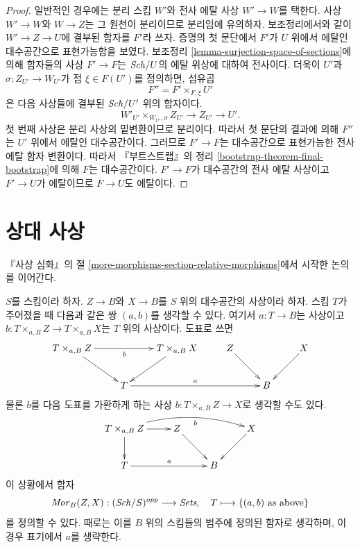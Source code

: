 \begin{proof}
\medskip\noindent
일반적인 경우에는 분리 스킴 $W'$와 전사 에탈 사상
$W' \to W$를 택한다. 사상 $W' \to W$와 $W \to Z$는 그 원천이
분리이므로 분리임에 유의하자. 보조정리에서와 같이
$W' \to Z \to U$에 결부된 함자를 $F'$라 쓰자. 증명의 첫 문단에서
$F'$가 $U$ 위에서 에탈인 대수공간으로 표현가능함을 보였다.
보조정리 \ref{lemma-surjection-space-of-sections}에 의해 함자들의 사상
$F' \to F$는 $\mathit{Sch}/U$의 에탈 위상에 대하여 전사이다.
더욱이 $U'$과 $\sigma : Z_{U'} \to W_{U'}$가 점
$\xi \in F(U')$를 정의하면, 섬유곱
$$
F'' = F' \times_{F, \xi} U'
$$
은 다음 사상들에 결부된 $\mathit{Sch}/U'$ 위의 함자이다.
$$
W'_{U'} \times_{W_{U'}, \sigma} Z_{U'} \to Z_{U'} \to U'.
$$
첫 번째 사상은 분리 사상의 밑변환이므로 분리이다. 따라서 첫 문단의
결과에 의해 $F''$는 $U'$ 위에서 에탈인 대수공간이다.
그러므로 $F' \to F$는 대수공간으로 표현가능한 전사 에탈 함자 변환이다.
따라서 『부트스트랩』의 정리
\ref{bootstrap-theorem-final-bootstrap}에 의해 $F$는 대수공간이다.
$F' \to F$가 대수공간의 전사 에탈 사상이고 $F' \to U$가
에탈이므로 $F \to U$도 에탈이다.
\end{proof}









\section{상대 사상}
\label{section-relative-morphisms}

\noindent
『사상 심화』의 절 \ref{more-morphisms-section-relative-morphisms}에서
시작한 논의를 이어간다.

\medskip\noindent
$S$를 스킴이라 하자. $Z \to B$와 $X \to B$를 $S$ 위의
대수공간의 사상이라 하자. 스킴 $T$가 주어졌을 때 다음과 같은 쌍
$(a, b)$를 생각할 수 있다. 여기서 $a : T \to B$는 사상이고
$b : T \times_{a, B} Z \to T \times_{a, B} X$는 $T$ 위의 사상이다.
도표로 쓰면
\begin{equation}
\label{equation-hom}
\vcenter{
\xymatrix{
T \times_{a, B} Z \ar[rd] \ar[rr]_b & &
T \times_{a, B} X \ar[ld] & Z \ar[rd] & & X \ar[ld] \\
& T \ar[rrr]^a & & & B
}
}
\end{equation}
물론 $b$를 다음 도표를 가환하게 하는 사상
$b : T \times_{a, B} Z \to X$로 생각할 수도 있다.
$$
\xymatrix{
T \times_{a, B} Z \ar[r] \ar[d] \ar@/^1pc/[rrr]_-b &
Z \ar[rd] & & X \ar[ld] \\
T \ar[rr]^a & & B
}
$$
이 상황에서 함자
\begin{equation}
\label{equation-hom-functor}
\mathit{Mor}_B(Z, X) : (\mathit{Sch}/S)^{opp} \longrightarrow \textit{Sets},
\quad
T \longmapsto \{(a, b)\text{ as above}\}
\end{equation}
를 정의할 수 있다. 때로는 이를 $B$ 위의 스킴들의 범주에 정의된
함자로 생각하며, 이 경우 표기에서 $a$를 생략한다.


